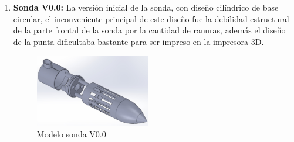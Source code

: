 \begin{appendices}
\begin{enumerate}
\item \textbf{Sonda V0.0:} La versión inicial de la sonda, con diseño cilíndrico de base circular, el inconveniente principal de este diseño fue la debilidad estructural de la parte frontal de la sonda por la cantidad de ranuras, además el diseño de la punta dificultaba bastante para ser impreso en la impresora 3D.
\begin{figure}[ht]
    \centering
    \includegraphics[width=50mm]{Imagenes/Sonda_v0.jpg}
    \caption{Modelo sonda V0.0}
    \label{fig:my_label}
\end{figure}


\end{enumerate}
\end{appendices}
